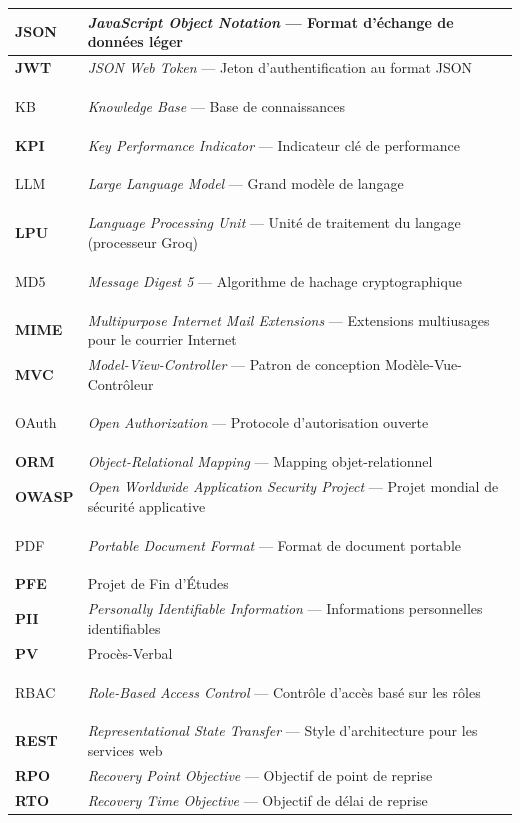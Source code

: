 \begin{longtable}{|>{\bfseries\color{primary}}m{3.2cm}|>{\RaggedRight\arraybackslash}m{11.5cm}|}
JSON  & \textit{JavaScript Object Notation} — Format d'échange de données léger \\
\hline
JWT   & \textit{JSON Web Token} — Jeton d'authentification au format JSON \\
\hline

KB    & \textit{Knowledge Base} — Base de connaissances \\
\hline
KPI   & \textit{Key Performance Indicator} — Indicateur clé de performance \\
\hline

LLM   & \textit{Large Language Model} — Grand modèle de langage \\
\hline
LPU   & \textit{Language Processing Unit} — Unité de traitement du langage (processeur Groq) \\
\hline

MD5   & \textit{Message Digest 5} — Algorithme de hachage cryptographique \\
\hline
MIME  & \textit{Multipurpose Internet Mail Extensions} — Extensions multiusages pour le courrier Internet \\
\hline
MVC   & \textit{Model-View-Controller} — Patron de conception Modèle-Vue-Contrôleur \\
\hline

OAuth & \textit{Open Authorization} — Protocole d'autorisation ouverte \\
\hline
ORM   & \textit{Object-Relational Mapping} — Mapping objet-relationnel \\
\hline
OWASP & \textit{Open Worldwide Application Security Project} — Projet mondial de sécurité applicative \\
\hline

PDF   & \textit{Portable Document Format} — Format de document portable \\
\hline
PFE   & Projet de Fin d'Études \\
\hline
PII   & \textit{Personally Identifiable Information} — Informations personnelles identifiables \\
\hline
PV    & Procès-Verbal \\
\hline

RBAC  & \textit{Role-Based Access Control} — Contrôle d'accès basé sur les rôles \\
\hline
REST  & \textit{Representational State Transfer} — Style d'architecture pour les services web \\
\hline
RPO   & \textit{Recovery Point Objective} — Objectif de point de reprise \\
\hline
RTO   & \textit{Recovery Time Objective} — Objectif de délai de reprise \\
\hline


\end{longtable}
